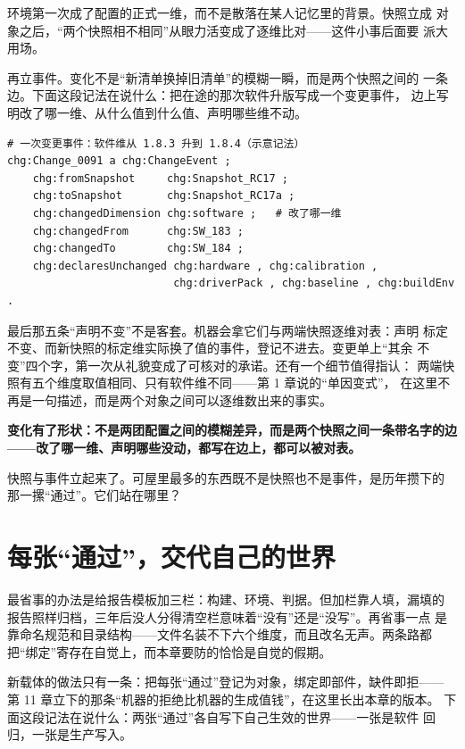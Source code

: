 环境第一次成了配置的正式一维，而不是散落在某人记忆里的背景。快照立成
对象之后，“两个快照相不相同”从眼力活变成了逐维比对——这件小事后面要
派大用场。

再立事件。变化不是“新清单换掉旧清单”的模糊一瞬，而是两个快照之间的
一条边。下面这段记法在说什么：把在途的那次软件升版写成一个变更事件，
边上写明改了哪一维、从什么值到什么值、声明哪些维不动。

\nopagebreak[4]
\begin{codebox}
\begin{Verbatim}[fontsize=\small,breaklines=true,breakanywhere=true,breaksymbolleft={},breaksymbolright={}]
# 一次变更事件：软件维从 1.8.3 升到 1.8.4（示意记法）
chg:Change_0091 a chg:ChangeEvent ;
    chg:fromSnapshot     chg:Snapshot_RC17 ;
    chg:toSnapshot       chg:Snapshot_RC17a ;
    chg:changedDimension chg:software ;   # 改了哪一维
    chg:changedFrom      chg:SW_183 ;
    chg:changedTo        chg:SW_184 ;
    chg:declaresUnchanged chg:hardware , chg:calibration ,
                          chg:driverPack , chg:baseline , chg:buildEnv .
\end{Verbatim}
\end{codebox}

最后那五条“声明不变”不是客套。机器会拿它们与两端快照逐维对表：声明
标定不变、而新快照的标定维实际换了值的事件，登记不进去。变更单上“其余
不变”四个字，第一次从礼貌变成了可核对的承诺。还有一个细节值得指认：
两端快照有五个维度取值相同、只有软件维不同——第 1 章说的“单因变式”，
在这里不再是一句描述，而是两个对象之间可以逐维数出来的事实。

\textbf{变化有了形状：不是两团配置之间的模糊差异，而是两个快照之间一条带名字的边——改了哪一维、声明哪些没动，都写在边上，都可以被对表。}

快照与事件立起来了。可屋里最多的东西既不是快照也不是事件，是历年攒下的
那一摞“通过”。它们站在哪里？

\section{每张“通过”，交代自己的世界}

最省事的办法是给报告模板加三栏：构建、环境、判据。但加栏靠人填，漏填的
报告照样归档，三年后没人分得清空栏意味着“没有”还是“没写”。再省事一点
是靠命名规范和目录结构——文件名装不下六个维度，而且改名无声。两条路都
把“绑定”寄存在自觉上，而本章要防的恰恰是自觉的假期。

新载体的做法只有一条：把每张“通过”登记为对象，绑定即部件，缺件即拒——
第 11 章立下的那条“机器的拒绝比机器的生成值钱”，在这里长出本章的版本。
下面这段记法在说什么：两张“通过”各自写下自己生效的世界——一张是软件
回归，一张是生产写入。

